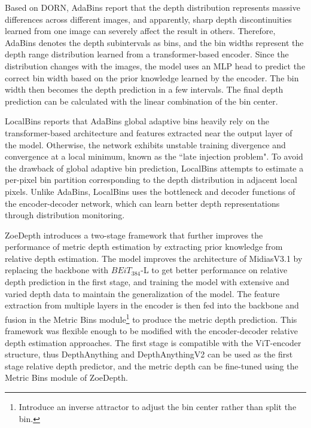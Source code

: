 Based on DORN, AdaBins\cite{bhat2021adabins} report that the depth distribution represents massive differences across different images, and apparently, sharp depth discontinuities learned from one image can severely affect the result in others. Therefore, AdaBins denotes the depth subintervals as bins, and the bin widths represent the depth range distribution learned from a transformer-based encoder. Since the distribution changes with the images, the model uses an MLP head to predict the correct bin width based on the prior knowledge learned by the encoder. The bin width then becomes the depth prediction in a few intervals. The final depth prediction can be calculated with the linear combination of the bin center.

LocalBins\cite{bhat2022localbins} reports that AdaBins global adaptive bins heavily rely on the transformer-based architecture and features extracted near the output layer of the model. Otherwise, the network exhibits unstable training divergence and convergence at a local minimum, known as the ``late injection problem". To avoid the drawback of global adaptive bin prediction, LocalBins attempts to estimate a per-pixel bin partition corresponding to the depth distribution in adjacent local pixels. Unlike AdaBins, LocalBins uses the bottleneck and decoder functions of the encoder-decoder network, which can learn better depth representations through distribution monitoring.

ZoeDepth\cite{bhat2023zoedepth} introduces a two-stage framework that further improves the performance of metric depth estimation by extracting prior knowledge from relative depth estimation. The model improves the architecture of MidiasV3.1 by replacing the backbone with $BEiT_{384}$-L\cite{beit} to get better performance on relative depth prediction in the first stage, and training the model with extensive and varied depth data to maintain the generalization of the model. The feature extraction from multiple layers in the encoder is then fed into the backbone and fusion in the Metric Bins module\footnote{Introduce an inverse attractor to adjust the bin center rather than split the bin.} to produce the metric depth prediction. This framework was flexible enough to be modified with the encoder-decoder relative depth estimation approaches. The first stage is compatible with the ViT-encoder structure, thus DepthAnything and DepthAnythingV2 can be used as the first stage relative depth predictor, and the metric depth can be fine-tuned using the Metric Bins module of ZoeDepth.

